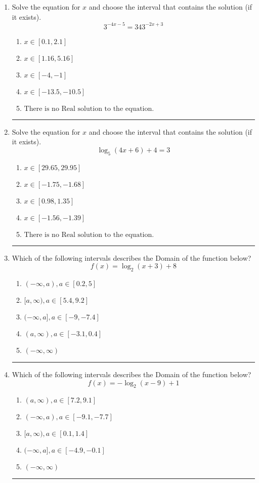 \documentclass[14pt]{extbook}
\newcommand{\litem}[1]{\item#1\hspace*{-1cm}\rule{\textwidth}{0.4pt}}
\begin{document}
\begin{enumerate}
{\begin{enumerate}[label=\Alph*.]
\end{enumerate} }
\litem{
Solve the equation for $x$ and choose the interval that contains the solution (if it exists).\[ 3^{-4x-5} = 343^{-2x+3} \]\begin{enumerate}[label=\Alph*.]
\item \( x \in [0.1, 2.1] \)
\item \( x \in [1.16, 5.16] \)
\item \( x \in [-4, -1] \)
\item \( x \in [-13.5, -10.5] \)
\item \( \text{There is no Real solution to the equation.} \)

\end{enumerate} }
\litem{
Solve the equation for $x$ and choose the interval that contains the solution (if it exists).\[ \log_{5}{(4x+6)}+4 = 3 \]\begin{enumerate}[label=\Alph*.]
\item \( x \in [29.65, 29.95] \)
\item \( x \in [-1.75, -1.68] \)
\item \( x \in [0.98, 1.35] \)
\item \( x \in [-1.56, -1.39] \)
\item \( \text{There is no Real solution to the equation.} \)

\end{enumerate} }
\litem{
Which of the following intervals describes the Domain of the function below?\[ f(x) = \log_2{(x+3)}+8 \]\begin{enumerate}[label=\Alph*.]
\item \( (-\infty, a), a \in [0.2, 5] \)
\item \( [a, \infty), a \in [5.4, 9.2] \)
\item \( (-\infty, a], a \in [-9, -7.4] \)
\item \( (a, \infty), a \in [-3.1, 0.4] \)
\item \( (-\infty, \infty) \)

\end{enumerate} }
\litem{
Which of the following intervals describes the Domain of the function below?\[ f(x) = -\log_2{(x-9)}+1 \]\begin{enumerate}[label=\Alph*.]
\item \( (a, \infty), a \in [7.2, 9.1] \)
\item \( (-\infty, a), a \in [-9.1, -7.7] \)
\item \( [a, \infty), a \in [0.1, 1.4] \)
\item \( (-\infty, a], a \in [-4.9, -0.1] \)
\item \( (-\infty, \infty) \)


\end{enumerate}}
\end{enumerate}
\end{document}
